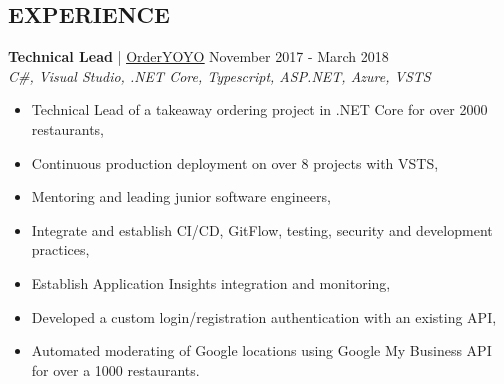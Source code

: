 \documentclass[margin, 10pt, hidelinks]{res} %
\newcommand{\emphasize}{\large\bfseries} %
\begin{document}
\begin{resume}





		


\section{EXPERIENCE}

{\emphasize Technical Lead} | \href{https://orderyoyo.com/}{\underline{OrderYOYO}}    \hfill November 2017 - March 2018  \\
{\it C\#, Visual Studio, .NET Core, Typescript, ASP.NET, Azure, VSTS} %
\begin{itemize} \setlength{\itemindent}{-0.1in}\itemsep 0pt %
\item Technical Lead of a takeaway ordering project in .NET Core for over 2000 restaurants,
\item Continuous production deployment on over 8 projects with VSTS,
\item Mentoring and leading junior software engineers,
\item Integrate and establish  CI/CD, GitFlow, testing, security and development practices,
\item Establish Application Insights integration and monitoring,
\item Developed a custom login/registration authentication with an existing API,
\item Automated moderating of Google locations using Google My Business API for over a 1000 restaurants.
\end{itemize}


\end{resume}
\end{document}
